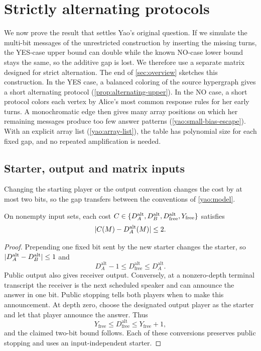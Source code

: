 \documentclass[11pt,letterpaper]{article} \usepackage[utf8]{inputenc}
\theoremstyle{plain} \newtheorem{theorem}{Theorem}[section]
\theoremstyle{definition} \newaliascnt{definition}{theorem}
\begin{document}
\section{Strictly alternating protocols}\label{sec:alternation}
\label{sec:alternating}

We now prove the result that settles Yao's original question. If we simulate
the multi-bit messages of the unrestricted construction by inserting the missing
turns, the YES-case upper bound can double while the known NO-case lower
bound stays the same, so the additive gap is lost. We therefore use a
separate matrix designed for strict alternation. The end of \cref{sec:overview} sketches
this construction. In the YES case, a balanced coloring of the source hypergraph gives a short alternating protocol
(\cref{prop:alternating-upper}). In the NO case, a short protocol
colors each vertex by Alice's most common response rules for her early turns. A monochromatic edge then gives many
array positions on which her remaining messages produce too few answer patterns
(\cref{yao:small-bias-escape}). With an explicit array list (\cref{yao:array-list}),
the table has polynomial size for each fixed gap, and no repeated amplification is
needed.

\subsection{Starter, output and matrix inputs}

Changing the starting player or the output convention changes the cost by at
most two bits, so the gap transfers between the conventions of \cref{yao:model}.

\begin{lemma}\label{yao:comparison}
On nonempty input sets, each cost
$C\in\{D_A^{\rm alt},D_B^{\rm alt},D_{\rm free}^{\rm alt},Y_{\rm free}\}$
satisfies
\[
|C(M)-D_A^{\rm alt}(M)|\le2.
\]
\end{lemma}
\begin{proof}
Prepending one fixed bit sent by the new starter changes the starter, so
$|D_A^{\rm alt}-D_B^{\rm alt}|\le1$ and
\[
D_A^{\mathrm{alt}}-1\le D_{\mathrm{free}}^{\mathrm{alt}}\le D_A^{\mathrm{alt}}.
\]
Public output also gives receiver output. Conversely, at a nonzero-depth
terminal transcript the receiver is the next scheduled speaker and can announce
the answer in one bit. Public stopping tells both players when to make this
announcement. At depth zero, choose the designated output player as the starter
and let that player announce the answer. Thus
\[
Y_{\mathrm{free}}\le D_{\mathrm{free}}^{\mathrm{alt}}\le Y_{\mathrm{free}}+1,
\]
and the claimed two-bit bound follows. Each of these conversions preserves public
stopping and uses an input-independent starter.
\end{proof}
\end{document}
